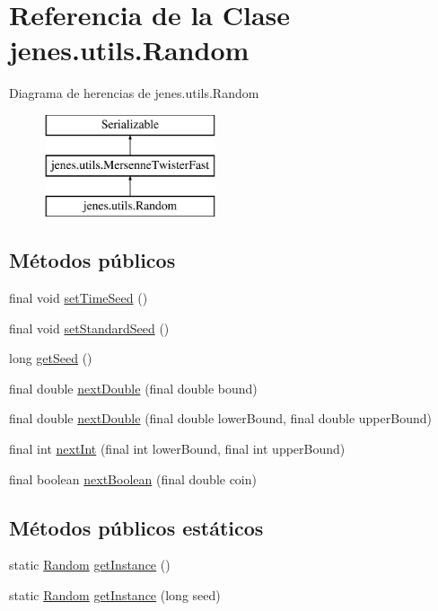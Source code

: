 \hypertarget{classjenes_1_1utils_1_1_random}{\section{Referencia de la Clase jenes.\-utils.\-Random}
\label{classjenes_1_1utils_1_1_random}
}
Diagrama de herencias de jenes.\-utils.\-Random\begin{figure}[H]
\begin{center}
\leavevmode
\includegraphics[height=3.000000cm]{classjenes_1_1utils_1_1_random}
\end{center}
\end{figure}
\subsection*{Métodos públicos}
\begin{DoxyCompactItemize}
\item 
final void \hyperlink{classjenes_1_1utils_1_1_random_a6eec3abcf133f7ce43d6a13441523a01}{set\-Time\-Seed} ()
\item 
final void \hyperlink{classjenes_1_1utils_1_1_random_a484017ff9c5473f7fc3fc7b52cb92433}{set\-Standard\-Seed} ()
\item 
long \hyperlink{classjenes_1_1utils_1_1_random_a55f9b0a836c137e520658f55ad806859}{get\-Seed} ()
\item 
final double \hyperlink{classjenes_1_1utils_1_1_random_abe2919ddf9245e0576591fa0ea26593f}{next\-Double} (final double bound)
\item 
final double \hyperlink{classjenes_1_1utils_1_1_random_a19babaa9c19de0243430cef2c445df9c}{next\-Double} (final double lower\-Bound, final double upper\-Bound)
\item 
final int \hyperlink{classjenes_1_1utils_1_1_random_ab066d2d2f6d32c89598c552a9dadedc0}{next\-Int} (final int lower\-Bound, final int upper\-Bound)
\item 
final boolean \hyperlink{classjenes_1_1utils_1_1_random_a16e9050a46f8218ec8e0f73c6456a5db}{next\-Boolean} (final double coin)
\end{DoxyCompactItemize}
\subsection*{Métodos públicos estáticos}
\begin{DoxyCompactItemize}
\item 
static \hyperlink{classjenes_1_1utils_1_1_random}{Random} \hyperlink{classjenes_1_1utils_1_1_random_aa8b8341f82ccf69de0b44c9f6f174820}{get\-Instance} ()
\item 
static \hyperlink{classjenes_1_1utils_1_1_random}{Random} \hyperlink{classjenes_1_1utils_1_1_random_a83dd69fffe081a48e58702c0f118b12e}{get\-Instance} (long seed)
\end{DoxyCompactItemize}
